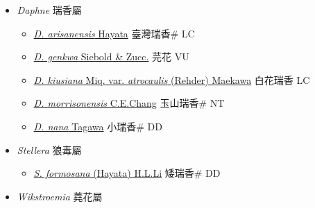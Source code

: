 
  \begin{itemize}
 \item[] \textit{Daphne} 瑞香屬
                    
  \begin{itemize}
        \item[] \href{http://www.theplantlist.org/tpl1.1/search?q=Daphne+arisanensis}{\textit{D. arisanensis} Hayata}   臺灣瑞香\# LC
        \item[] \href{http://www.theplantlist.org/tpl1.1/search?q=Daphne+genkwa}{\textit{D. genkwa} Siebold \& Zucc.}   芫花 VU
        \item[] \href{http://www.theplantlist.org/tpl1.1/search?q=Daphne+kiusiana+var.+atrocaulis}{\textit{D. kiusiana} Miq. var. \textit{atrocaulis} (Rehder) Maekawa}   白花瑞香 LC
        \item[] \href{http://www.theplantlist.org/tpl1.1/search?q=Daphne+morrisonensis}{\textit{D. morrisonensis} C.E.Chang}   玉山瑞香\# NT
        \item[] \href{http://www.theplantlist.org/tpl1.1/search?q=Daphne+nana}{\textit{D. nana} Tagawa}   小瑞香\# DD
  \end{itemize}
 \item[] \textit{Stellera} 狼毒屬
                    
  \begin{itemize}
        \item[] \href{http://www.theplantlist.org/tpl1.1/search?q=Stellera+formosana}{\textit{S. formosana} (Hayata) H.L.Li}   矮瑞香\# DD
  \end{itemize}
 \item[] \textit{Wikstroemia} 蕘花屬
                    

\end{itemize}
